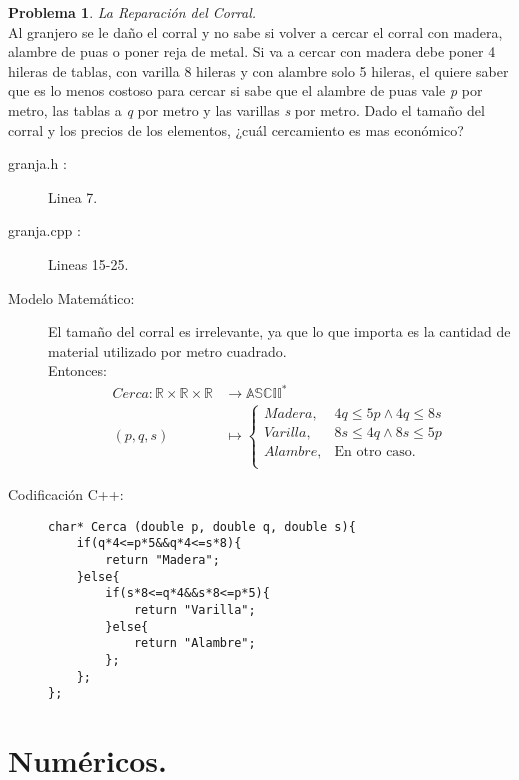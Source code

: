 \documentclass{article}
\theoremstyle{plain}
\theoremstyle{definition}
\newtheorem{problem}{Problema}
\begin{document}
\begin{problem} \emph{La Reparación del Corral.}\\
\hspace*{7mm}Al granjero se le daño el corral y no sabe si volver a cercar el corral con madera,  alambre de puas o poner reja de metal. Si va a cercar con madera debe poner 4 hileras de tablas, con varilla 8 hileras y con alambre solo 5 hileras, el quiere saber que es lo menos costoso para cercar si sabe que el alambre de puas vale \emph{p} por metro, las tablas a \emph{q} por metro y las varillas \emph{s} por metro. Dado el tamaño del corral y los precios de los elementos, ¿cuál cercamiento es mas económico?
%
\begin{description}
\item[granja.h :] Linea 7. \item[granja.cpp :] Lineas 15-25.

\item[Modelo Matemático:]
%
El tamaño del corral es irrelevante, ya que lo que importa es la cantidad de material utilizado por metro cuadrado. \\
Entonces:
\begin{align*}
Cerca: \mathbb{R}\times\mathbb{R}\times\mathbb{R} &\to \mathbb{ASCII}^{*}\\
(p,q,s) &\mapsto
\begin{cases}
Madera, &4q\leq 5p \wedge 4q\leq 8s\\
Varilla, &8s \leq 4q \wedge 8s\leq 5p\\
Alambre, &\text{En otro caso.}\\
\end{cases}
\end{align*}
\item[Codificación \textsf{C++}:]\hfill
%
\begin{verbatim}
char* Cerca (double p, double q, double s){
    if(q*4<=p*5&&q*4<=s*8){
        return "Madera";
    }else{
        if(s*8<=q*4&&s*8<=p*5){
            return "Varilla";
        }else{
            return "Alambre";
        };
    };
};
\end{verbatim}
\end{description}
\end{problem}


\section{Numéricos.}
\end{document}

